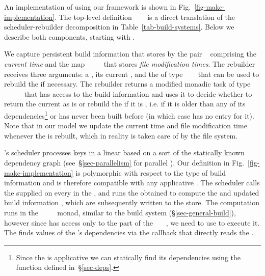 An implementation of \Make using our framework is shown in
Fig.~\ref{fig-make-implementation}. The top-level definition
~\hs{=}~~ is a direct translation
of the scheduler-rebuilder decomposition in Table~\ref{tab-build-systems}. Below
we describe both components, starting with .

We capture persistent build information that \Make stores by the pair
~ comprising the \emph{current time}  and the
map ~\hs{::}~~~ that stores \emph{file
modification times}. The rebuilder receives three arguments: a , its
current , and the  of type
~~~ that can be used to rebuild the
 if necessary. The rebuilder returns a modified monadic task of type
~~~~~ that has
access to the build information and uses it to decide whether to return the
current  as is or rebuild the  if it is , i.e.
if it is older than any of its dependencies\footnote{Since the  is
applicative we can statically find its dependencies using the function
 defined in~\S\ref{sec-deps}.} or has never been built before
(in which case  has no entry for it). Note that in our model we
update the current time and file modification time whenever the  is
rebuilt, which in reality is taken care of by the file system.

\Make's scheduler processes keys in a linear  based on a
 sort of the statically known dependency graph
(see~\S\ref{sec-parallelism} for parallel \Make). Our definition in
Fig.~\ref{fig-make-implementation} is polymorphic with respect to the type of
build information  and is therefore compatible with any applicative
. The scheduler calls the supplied  on every
 in the , and runs the obtained  to compute the
 and updated build information , which are subsequently
written to the store. The computation runs in the
~~~~ monad, similar to the 
build system (\S\ref{sec-general-build}), however since  has access
only to the  part of the ~~~, we need to use
 to execute it. The  finds values of the 's
dependencies via the  callback that directly reads the .

